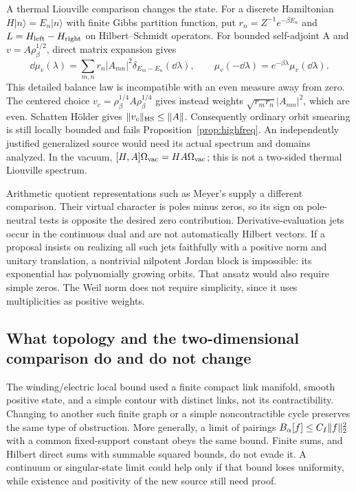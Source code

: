 A thermal Liouville comparison changes the state.
For a discrete Hamiltonian $H|n\rangle=E_n|n\rangle$
with finite Gibbs partition function, put
$r_n=Z^{-1}e^{-\beta E_n}$ and
$L=H_{\rm left}-H_{\rm right}$ on Hilbert--Schmidt
operators. For bounded self-adjoint A and
$v=A\rho_\beta^{1/2}$, direct matrix expansion gives
\begin{equation}
\dd\mu_v(\lambda)=
\sum_{m,n}r_n|A_{mn}|^2\delta_{E_m-E_n}(\dd\lambda),
\qquad \mu_v(-\dd\lambda)=e^{-\beta\lambda}\mu_v(\dd\lambda).
\end{equation}
This detailed balance law is incompatible with an
even measure away from zero. The centered choice
$v_c=\rho_\beta^{1/4}A\rho_\beta^{1/4}$ gives instead
weights $\sqrt{r_mr_n}|A_{mn}|^2$, which are even.
Schatten H\"older gives $\lVert v_c\rVert_{\rm HS}\le\lVert A\rVert$.
Consequently ordinary orbit smearing is still locally
bounded and fails Proposition~\ref{prop:highfreq}.
An independently justified generalized source would
need its actual spectrum and domains analyzed.
In the vacuum, $[H,A]\Omega_{\rm vac}=HA\Omega_{\rm vac}$;
this is not a two-sided thermal Liouville spectrum.

Arithmetic quotient representations such as Meyer's
\cite{meyer} supply a different comparison. Their
virtual character is poles minus zeros, so its sign
on pole-neutral tests is opposite the desired zero
contribution. Derivative-evaluation jets occur in
the continuous dual and are not automatically Hilbert
vectors. If a proposal insists on realizing all such
jets faithfully with a positive norm and unitary
translation, a nontrivial nilpotent Jordan block is
impossible: its exponential has polynomially growing
orbits. That ansatz would also require simple zeros.
The Weil norm does not require simplicity, since
it uses multiplicities as positive weights.

\subsection{What topology and the two-dimensional comparison do and do not change}
The winding/electric local bound used a finite compact
link manifold, smooth positive state, and a simple
contour with distinct links, not its contractibility.
Changing to another such finite graph or a simple
noncontractible cycle preserves the same type of
obstruction. More generally, a limit of pairings
$B_\alpha[f]\le C_I\lVert f\rVert_2^2$ with a common
fixed-support constant obeys the same bound.
Finite sums, and Hilbert direct sums with summable
squared bounds, do not evade it. A continuum or
singular-state limit could help only if that bound
loses uniformity, while existence and positivity
of the new source still need proof.

